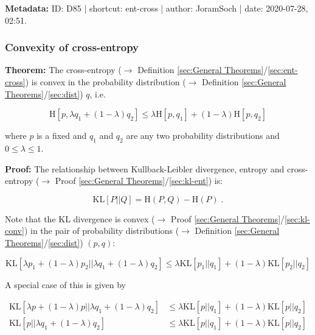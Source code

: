 \documentclass[a4paper,12pt,twoside]{book}
\begin{document}
\vspace{1em}
\textbf{Metadata:} ID: D85 | shortcut: ent-cross | author: JoramSoch | date: 2020-07-28, 02:51.
\vspace{1em}



\subsubsection[\textbf{Convexity of cross-entropy}]{Convexity of cross-entropy} \label{sec:entcross-conv}
\setcounter{equation}{0}

\textbf{Theorem:} The cross-entropy ($\rightarrow$ Definition \ref{sec:General Theorems}/\ref{sec:ent-cross}) is convex in the probability distribution ($\rightarrow$ Definition \ref{sec:General Theorems}/\ref{sec:dist}) $q$, i.e.

\begin{equation} \label{eq:entcross-conv-ent-cross-conv}
\mathrm{H}[p,\lambda q_1 + (1-\lambda) q_2] \leq \lambda \mathrm{H}[p,q_1] + (1-\lambda) \mathrm{H}[p,q_2]
\end{equation}

where $p$ is a fixed and $q_1$ and $q_2$ are any two probability distributions and $0 \leq \lambda \leq 1$.


\vspace{1em}
\textbf{Proof:} The relationship between Kullback-Leibler divergence, entropy and cross-entropy ($\rightarrow$ Proof \ref{sec:General Theorems}/\ref{sec:kl-ent}) is:

\begin{equation} \label{eq:entcross-conv-kl-ent}
\mathrm{KL}[P||Q] = \mathrm{H}(P,Q) - \mathrm{H}(P) \; .
\end{equation}

Note that the KL divergence is convex ($\rightarrow$ Proof \ref{sec:General Theorems}/\ref{sec:kl-conv}) in the pair of probability distributions ($\rightarrow$ Definition \ref{sec:General Theorems}/\ref{sec:dist}) $(p,q)$:

\begin{equation} \label{eq:entcross-conv-kl-conv}
\mathrm{KL}[\lambda p_1 + (1-\lambda) p_2||\lambda q_1 + (1-\lambda) q_2] \leq \lambda \mathrm{KL}[p_1||q_1] + (1-\lambda) \mathrm{KL}[p_2||q_2]
\end{equation}

A special case of this is given by

\begin{equation} \label{eq:entcross-conv-kl-conv-p}
\begin{split}
\mathrm{KL}[\lambda p + (1-\lambda) p||\lambda q_1 + (1-\lambda) q_2] &\leq \lambda \mathrm{KL}[p||q_1] + (1-\lambda) \mathrm{KL}[p||q_2] \\
\mathrm{KL}[p||\lambda q_1 + (1-\lambda) q_2] &\leq \lambda \mathrm{KL}[p||q_1] + (1-\lambda) \mathrm{KL}[p||q_2]
\end{split}
\end{equation}
\end{document}
